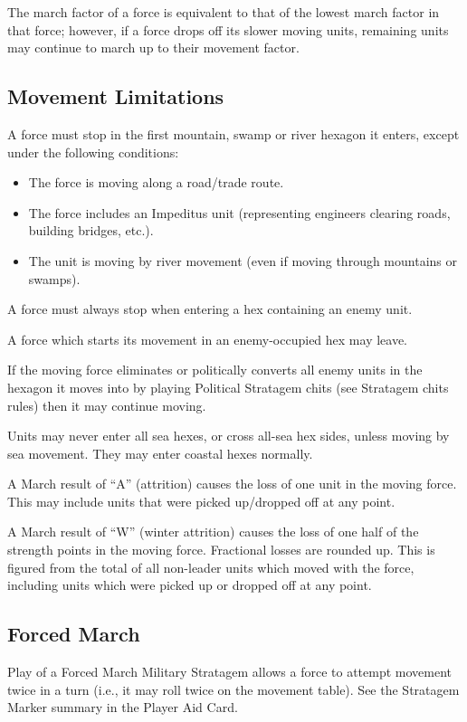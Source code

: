 The march factor of a force is equivalent to that of the lowest march factor in that force; however, if a force drops off its slower moving units, remaining units may continue to march up to their movement factor.

\subsection{Movement Limitations}

A force must stop in the first mountain, swamp or river hexagon it enters, except under the following conditions:

\begin{itemize}
  \item The force is moving along a road/trade route.
  \item The force includes an Impeditus unit (representing engineers clearing roads, building bridges, etc.).
  \item The unit is moving by river movement (even if moving through mountains or swamps).
\end{itemize}

A force must always stop when entering a hex containing an enemy unit.

A force which starts its movement in an enemy-occupied hex may leave.

If the moving force eliminates or politically converts all enemy units in the hexagon it moves into by playing Political Stratagem chits (see Stratagem chits rules) then it may continue moving.

Units may never enter all sea hexes, or cross all-sea hex sides, unless moving by sea movement. They may enter coastal hexes normally.

A March result of “A” (attrition) causes the loss of one unit in the moving force. This may include units that were picked up/dropped off at any point.

A March result of “W” (winter attrition) causes the loss of one half of the strength points in the moving force. Fractional losses are rounded up. This is figured from the total of all non-leader units which moved with the force, including units which were picked up or dropped off at any point.

\subsection{Forced March}

Play of a Forced March Military Stratagem allows a force to attempt movement twice in a turn (i.e., it may roll twice on the movement table). See the Stratagem Marker summary in the Player Aid Card.

